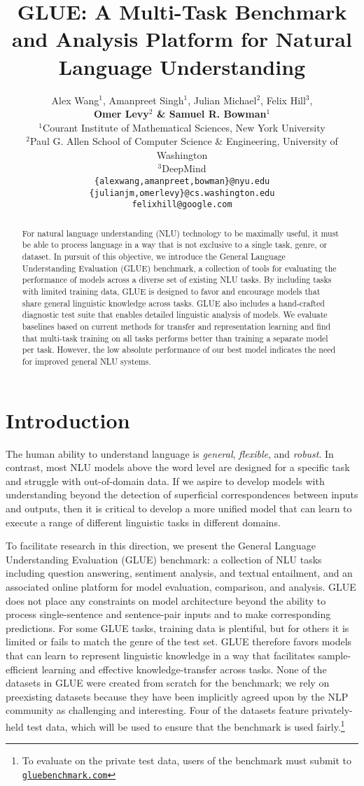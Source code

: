 \documentclass{article} \usepackage{iclr2019_conference,times}
\title{GLUE: A Multi-Task Benchmark and Analysis Platform for Natural Language Understanding}
\author{Alex Wang$^1$, Amanpreet Singh$^1$, Julian Michael$^2$, Felix Hill$^3$, \\ \textbf{Omer Levy$^2$ \& Samuel R. Bowman$^1$} \\
$^1$Courant Institute of Mathematical Sciences, New York University\\
$^2$Paul G. Allen School of Computer Science \& Engineering, University of Washington\\
$^3$DeepMind\\
\texttt{\{alexwang,amanpreet,bowman\}@nyu.edu} \\
\texttt{\{julianjm,omerlevy\}@cs.washington.edu} \\
\texttt{felixhill@google.com}
}
\begin{document}
\maketitle

\begin{abstract}
For natural language understanding (NLU) technology to be maximally useful, it must be able to process language in a way that is not exclusive to a single task, genre, or dataset.
In pursuit of this objective, we introduce the General Language Understanding Evaluation (GLUE) benchmark, a collection of tools for evaluating the performance of models across a diverse set of existing NLU tasks.
By including tasks with limited training data, GLUE is designed to favor and encourage models that share general linguistic knowledge across tasks.
GLUE also includes a hand-crafted diagnostic test suite that enables detailed linguistic analysis of models.
We evaluate baselines based on current methods for transfer and representation learning and find that multi-task training on all tasks performs better than training a separate model per task. However, the low absolute performance of our best model indicates the need for improved general NLU systems. 
\end{abstract}


\section{Introduction}\label{sec:intro}

The human ability to understand language is \emph{general}, \textit{flexible}, and \textit{robust}. 
In contrast, most NLU models above the word level are designed for a specific task and struggle with out-of-domain data. 
If we aspire to develop models with understanding beyond the detection of superficial correspondences between inputs and outputs, 
then it is critical to develop a more unified model that can learn to execute a range of different linguistic tasks in different domains.

To facilitate research in this direction, we present the General Language Understanding Evaluation 
(GLUE)
benchmark: a collection of NLU tasks including question answering, sentiment analysis, and textual entailment, and an associated online platform for model evaluation, comparison, and analysis.
GLUE does not place any constraints on model architecture beyond the ability to process single-sentence and sentence-pair inputs and to make corresponding predictions. 
For some GLUE tasks, training data is plentiful, but for others it is limited or fails to match the genre of the test set. GLUE therefore favors models that can learn to represent linguistic knowledge in a way that facilitates sample-efficient learning and effective knowledge-transfer across tasks. 
None of the datasets in GLUE were created from scratch for the benchmark; we rely on preexisting datasets because they have been implicitly agreed upon by the NLP community as challenging and interesting.
Four of the datasets feature privately-held test data, which will be used to ensure that the benchmark is used fairly.\footnote{To evaluate on the private test data, users of the benchmark must submit to \texttt{\href{gluebenchmark.com}{gluebenchmark.com}}}
\end{document}
